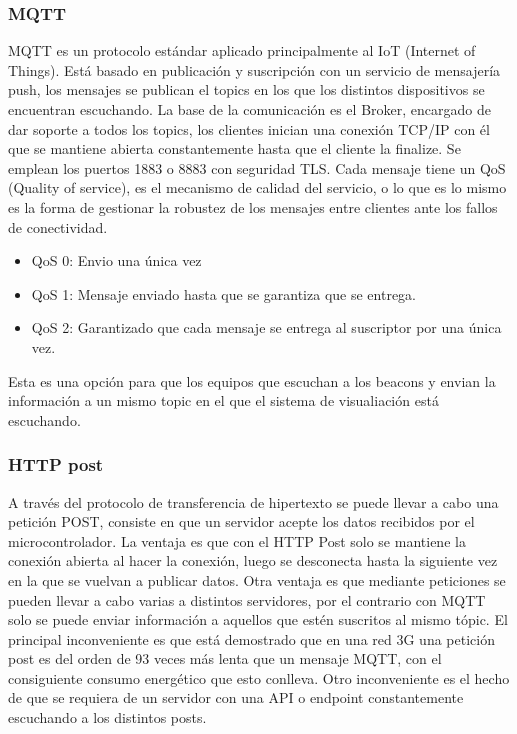 \documentclass[a4paper ,12pt, onecolumn]{article}
\begin{document}
\begin{enumerate}
        \subsubsection {MQTT}
            MQTT es un protocolo estándar aplicado principalmente al IoT (Internet of Things). Está basado en publicación y 
            suscripción con un servicio de mensajería push, los mensajes se publican el topics en los que los distintos 
            dispositivos se encuentran escuchando.
            La base de la comunicación es el Broker, encargado de dar soporte a todos los topics, los clientes inician una 
            conexión TCP/IP con él que se mantiene abierta constantemente hasta que el cliente la finalize. Se emplean los puertos
            1883 o 8883 con seguridad TLS.
            Cada mensaje tiene un QoS (Quality of service), es el mecanismo de calidad del servicio, o lo que es lo mismo es la forma de
            gestionar la robustez de los mensajes entre clientes ante los fallos de conectividad.
            \begin{itemize}
                \item QoS 0: Envio una única vez
                \item QoS 1: Mensaje enviado hasta que se garantiza que se entrega.
                \item QoS 2: Garantizado que cada mensaje se entrega al suscriptor por una única vez.
            \end{itemize}
            Esta es una opción para que los equipos que escuchan a los beacons y envian la información a un mismo
            topic en el que el sistema de visualiación está escuchando.
        \subsubsection {HTTP post}
            A través del protocolo de transferencia de hipertexto se puede llevar a cabo una petición POST, consiste en que
            un servidor acepte los datos recibidos por el microcontrolador.
            La ventaja es que con el HTTP Post solo se mantiene la conexión abierta al hacer la conexión, luego se desconecta hasta 
            la siguiente vez en la que se vuelvan a publicar datos. Otra ventaja es que mediante peticiones se pueden llevar a 
            cabo varias a distintos servidores, por el contrario con MQTT solo se puede enviar información a aquellos que estén
            suscritos al mismo tópic.
            El principal inconveniente es que está demostrado que en una red 3G una petición post es del orden de 93 veces
            más lenta que un mensaje MQTT, con el consiguiente consumo energético que esto conlleva. Otro inconveniente es el hecho 
            de que se requiera de un servidor con una API o endpoint constantemente escuchando a los distintos posts.

\end{enumerate}
\end{document}
